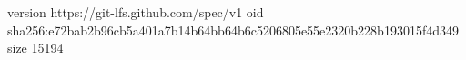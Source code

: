 version https://git-lfs.github.com/spec/v1
oid sha256:e72bab2b96cb5a401a7b14b64bb64b6c5206805e55e2320b228b193015f4d349
size 15194
